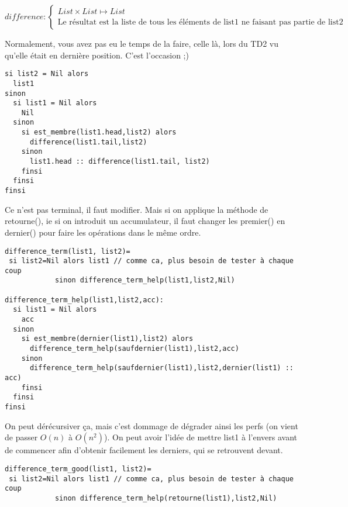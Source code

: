 \documentclass[10pt]{article}\usepackage[correction]{esial}
\begin{document}
\begin{Question}
  $difference: \left\{
    \begin{array}{l}
      List\times List\mapsto List\\
      \text{Le résultat est la liste de tous les éléments de list1 ne faisant
        pas partie de list2}
    \end{array}\right.$    
\end{Question}
\begin{Reponse}
  Normalement, vous avez pas eu le temps de la faire, celle là, lors du TD2 vu
  qu'elle était en dernière position. C'est l'occasion ;)
  \begin{Verbatim}[label=difference(list1\quotesinglbase list2)]
si list2 = Nil alors
  list1
sinon 
  si list1 = Nil alors
    Nil
  sinon
    si est_membre(list1.head,list2) alors
      difference(list1.tail,list2)
    sinon
      list1.head :: difference(list1.tail, list2)
    finsi
  finsi
finsi    
  \end{Verbatim}

  Ce n'est pas terminal, il faut modifier. Mais si on applique la méthode de
  retourne(), ie si on introduit un accumulateur, il faut changer les premier()
  en dernier() pour faire les opérations dans le même ordre. 

  \begin{Verbatim}[label=version terminale]
difference_term(list1, list2)=
 si list2=Nil alors list1 // comme ca, plus besoin de tester à chaque coup
            sinon difference_term_help(list1,list2,Nil)

difference_term_help(list1,list2,acc):
  si list1 = Nil alors
    acc
  sinon
    si est_membre(dernier(list1),list2) alors
      difference_term_help(saufdernier(list1),list2,acc)
    sinon
      difference_term_help(saufdernier(list1),list2,dernier(list1) :: acc)
    finsi
  finsi
finsi    
  \end{Verbatim}

  On peut dérécursiver ça, mais c'est dommage de dégrader ainsi les perfs (on
  vient de passer $O(n)$ à $O(n^2)$).  On peut avoir l'idée de mettre list1 à
  l'envers avant de commencer afin d'obtenir facilement les derniers, qui se
  retrouvent devant.

  \begin{Verbatim}[label=version terminale efficace]
difference_term_good(list1, list2)=
 si list2=Nil alors list1 // comme ca, plus besoin de tester à chaque coup
            sinon difference_term_help(retourne(list1),list2,Nil)


\end{Verbatim}
\end{Reponse}
\end{document}
